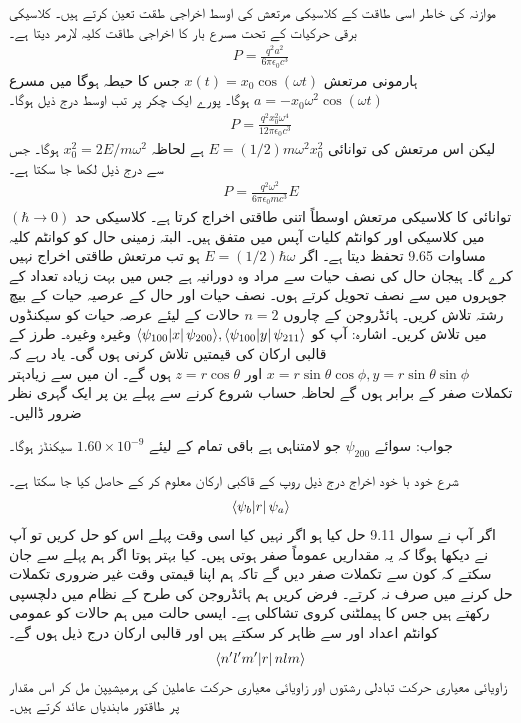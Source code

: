 موازنہ کی خاطر اسی طاقت کے کلاسیکی مرتعش کی اوسط اخراجی طقت تعین کرتے ہیں۔ کلاسیکی برقی حرکیات کے تحت مسرع بار  کا اخراجی طاقت کلیہ لارمر دیتا ہے۔
\begin{align}
	P = \frac{q^2a^2}{6\pi\epsilon_0c^3}
\end{align}
ہارمونی مرتعش \(x(t) = x_0\cos(\omega t)\) جس کا حیطہ  ہوگا میں مسرع \(a = -x_0\omega^2\cos(\omega t)\) ہوگا۔ پورے ایک چکر پر تب اوسط درج ذیل ہوگا۔
\begin{align*}
	P = \frac{q^2x^2_0\omega^4}{12\pi\epsilon_0c^3}
\end{align*}
لیکن اس مرتعش کی توانائی \(E = (1/2)m\omega^2x_0^2\) ہے لحاظہ \(x_0^2 = 2E/m\omega^2\) ہوگا۔ جس سے درج ذیل لکھا جا سکتا ہے۔
\begin{align}
	P = \frac{q^2\omega^2}{6\pi\epsilon_0mc^3}E
\end{align}
توانائی  کا کلاسیکی مرتعش اوسطاً اتنی طاقتی اخراج کرتا ہے۔ کلاسیکی حد \((\hbar\rightarrow0)\) میں کلاسیکی اور کوانٹم کلیات آپس میں متفق ہیں۔ البتہ زمینی حال کو کوانٹم کلیہ مساوات \num{9.65} تحفظ دیتا ہے۔ اگر \(E = (1/2)\hbar\omega\) ہو تب مرتعش طاقتی اخراج نہیں کرے گا۔
ہیجان حال کی نصف حیات سے مراد وہ دورانیہ ہے جس میں بہت زیادہ تعداد کے جوہروں میں سے نصف تحویل کرتے ہوں۔ نصف حیات اور حال کے عرصیہ حیات کے بیچ رشتہ تلاش کریں۔
ہائڈروجن کے چاروں \(n=2\) حالات کے لیئے عرصہ حیات کو سیکنڈوں میں تلاش کریں۔ اشارہ: آپ کو \(\langle \psi_{100}\abs{x}\psi_{200} \rangle, \langle \psi_{100}\abs{y}\psi_{211} \rangle\) وغیرہ وغیرہ۔ طرز کے قالبی ارکان کی قیمتیں تلاش کرنی ہوں گی۔ یاد رہے کہ \(x = r\sin\theta\cos\phi, y = r\sin\theta\sin\phi\) اور \(z = r\cos\theta\) ہوں گے۔ ان میں سے زیادہتر تکملات صفر کے برابر ہوں گے لحاظہ حساب شروع کرنے سے پہلے ین پر ایک گہری نظر ضرور ڈالیں۔

جواب: سوائے \(\psi_{200}\) جو لامتناہی ہے باقی تمام کے لیئے \(\num{1.60}\times10^{-9}\) سیکنڈز ہوگا۔


شرع خود با خود اخراج درج ذیل روپ کے قاکبی ارکان معلوم کر کے حاصل کیا جا سکتا ہے۔
\begin{align*}
	\langle \psi_b\abs{r}\psi_a \rangle
\end{align*}
اگر آپ نے سوال \num{9.11} حل کیا ہو اگر نہیں کیا اسی وقت پہلے اس کو حل کریں تو آپ نے دیکھا ہوگا کہ یہ مقداریں عموماً صفر ہوتی ہیں۔ کیا بہتر ہوتا اگر ہم پہلے سے جان سکتے کہ کون سے تکملات صفر دیں گے تاکہ ہم اپنا قیمتی وقت غیر ضروری تکملات حل کرنے میں صرف نہ کرتے۔ فرض کریں ہم ہائڈروجن کی طرح کے نظام میں دلچسپی رکھتے ہیں جس کا ہیملٹنی کروی تشاکلی ہے۔ ایسی حالت میں ہم حالات کو عمومی کوانٹم اعداد  اور  سے ظاہر کر سکتے ہیں اور قالبی ارکان درج ذیل ہوں گے۔  
\begin{align*}
	\langle n^\prime l^\prime m^\prime\abs{r}nlm \rangle
\end{align*}
زاویائی معیاری حرکت تبادلی رشتوں اور زاویائی معیاری حرکت عاملین کی ہرمیشیپن مل کر اس مقدار پر طاقتور مابندیاں عائد کرتے ہیں۔

